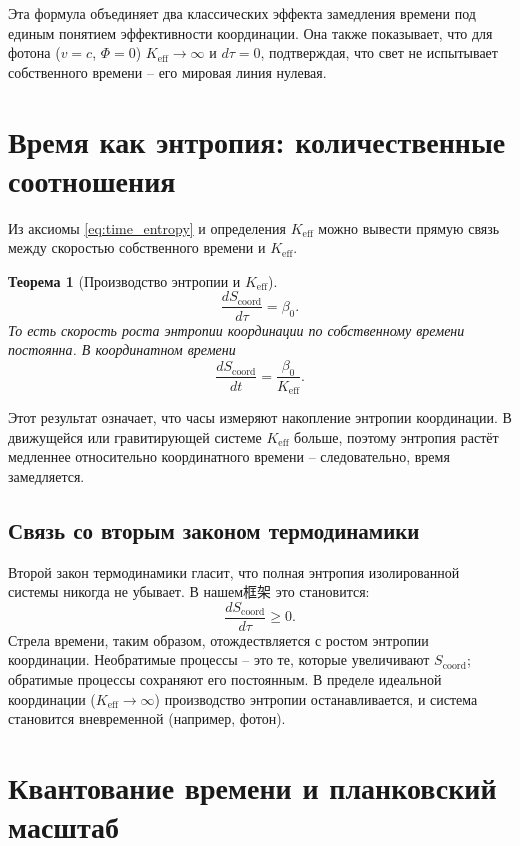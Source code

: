 \documentclass[12pt,a4paper]{article}
\newtheorem{theorem}{Теорема}[section]
\newcommand{\Keff}{K_{\mathrm{eff}}}
\newcommand{\Scoord}{S_{\mathrm{coord}}}
\begin{document}
	Эта формула объединяет два классических эффекта замедления времени под единым понятием эффективности координации. Она также показывает, что для фотона (\(v=c\), \(\Phi=0\)) \(\Keff \to \infty\) и \(d\tau = 0\), подтверждая, что свет не испытывает собственного времени – его мировая линия нулевая.
	
	\section{Время как энтропия: количественные соотношения}
	\label{sec:entropy}
	
	Из аксиомы \ref{eq:time_entropy} и определения \(\Keff\) можно вывести прямую связь между скоростью собственного времени и \(\Keff\).
	
	\begin{theorem}[Производство энтропии и \(\Keff\)]
		\[
		\frac{d\Scoord}{d\tau} = \beta_0.
		\]
		То есть скорость роста энтропии координации по собственному времени постоянна. В координатном времени
		\[
		\frac{d\Scoord}{dt} = \frac{\beta_0}{\Keff}.
		\]
	\end{theorem}
	
	Этот результат означает, что часы измеряют накопление энтропии координации. В движущейся или гравитирующей системе \(\Keff\) больше, поэтому энтропия растёт медленнее относительно координатного времени – следовательно, время замедляется.
	
	\subsection{Связь со вторым законом термодинамики}
	
	Второй закон термодинамики гласит, что полная энтропия изолированной системы никогда не убывает. В нашем框架 это становится:
	\begin{equation}
		\frac{d\Scoord}{d\tau} \ge 0.
	\end{equation}
	Стрела времени, таким образом, отождествляется с ростом энтропии координации. Необратимые процессы – это те, которые увеличивают \(\Scoord\); обратимые процессы сохраняют его постоянным. В пределе идеальной координации (\(\Keff \to \infty\)) производство энтропии останавливается, и система становится вневременной (например, фотон).
	
	\section{Квантование времени и планковский масштаб}
	\label{sec:quantization}
	
\end{document}

